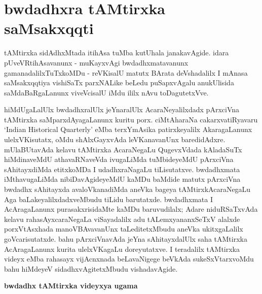 \makeatletter
\def\@makechapterhead#1{%
  \vspace*{10\p@}%
{\fontsize{13pt}{13pt}\selectfont\raggedright{\bf  benAyf toVSf BaTATxcAyaR}\par}
\vspace*{25\p@}%
  {\parindent \z@ \centering \normalfont
    \ifnum \c@secnumdepth >\m@ne
      \if@mainmatter
        {\huge\bfseries  #1}\par\nobreak
	\vskip 4pt
      \fi
    \fi
\smallskip 

 \vskip 10\p@  
{\fontsize{12pt}{12pt}\selectfont\raggedleft{anu: \bf pu.ti.na.}\par}
  }
\vskip 30\p@}
\makeatother

\chapter{bwdadhxra tAMtirxka saMsakxqqti}\label{chap003}

tAMtirxka sidAdhxMtada itihAsa tuMba kutUhala janakavAgide. idara pUveVRtihAsa\-vanunx - muKayxvAgi bwdadhxmatavanunx gamanadalilxTuTxkoMDu - reVKisalU matutx BArata deVshadalilx I mAnasa saMsakxqqtiya vishiSaTx parxNALike beLedu puSapxvAgalu anukUlisida saMdaBaRgaLanunx viveVcisalU iMdu ililx nAvu toDagutetxVve.

hiMdUgaLalUlx bwdadhxralUlx jeYnaralUlx AcaraNeyalilxdadx pArxciVna tAMtirxka saMparxdAyagaLanunx kuritu porx. ciMtAharaNa cakarxvatiRyavaru {\rm`Indian Historical Quarterly'} eMba terxYmAsika patirxkeyalilx AkaragaLanunx ulelxVKisutatx, oMdu shAlxGayxvAda leVKanavanUnx baredidAdxre. mUlaBUtavAda kelavu tAMtirxka AcaraNegaLu QugevxVdada kAladaSuTx hiMdinaveMdU athavaRNaveVda ivugaLiMda tuMbideyeMdU pArxciVna sAhitayxdiMda etitxkoMDa I udadhxraNagaLu tiLisutatxve. bwdadhxmata iMthavugaLiMda nibiDavAgideyeMdU kaMDu baMdide matutx pArxciVna bwdadhx sAhitayxda avaloVkanadiMda aneVka bageya tAMtirxkAcaraNegaLu Aga baLakeyalilxdadxveMbudu tiLidu barutatxde. bwdadhxmata I AcAragaLanunx purasakxrisidaMte kaMDu baruvudilalx; Adare niduRSaTxvAda kelavu rahasAyxcaraNegaLa viSayadalilx adu tALemxyananxSeTxV alalxde porxVtAsxhada manoVBAvavanUnx taLeditetxMbudu aneVka ukitxgaLalilx goVcarisutatxde. bahu pArxciVnavAda jeYna sAhitayxdalUlx saha tAMtirxka AcAragaLanunx kurita ulelxVKagaLu doreyutatxve. I teradalilx tAMtirxka videyx eMba rahasayx vijAcnxnada beLavaNigege beVkAda sukeSxVtarxvoMdu bahu hiMdeyeV sidadhxvAgitetxMbudu vishadavAgide.

\smallskip
\begin{center}
{\Large\bf bwdadhx tAMtirxka videyxya ugama}
\end{center}

